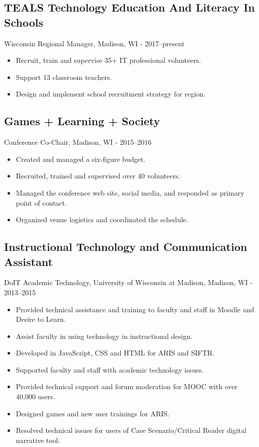 \documentclass[../main.tex]{subfiles}
\begin{document}
\subsection*{TEALS Technology Education And Literacy In Schools}
     Wisconsin Regional Manager, Madison, WI - 2017--present
	\begin{itemize}
		\item{Recruit, train and supervise 35+ IT professional volunteers.}
		\item{Support 13 classroom teachers.}
		\item{Design and implement school recruitment strategy for region.}

	\end{itemize}


\subsection*{Games + Learning + Society }
     Conference Co-Chair, Madison, WI - 2015--2016
	\begin{itemize}
		\item{Created and managed a six-figure budget.}
		\item{Recruited, trained and supervised over 40 volunteers.}
		\item{Managed the conference web site, social media, and responded as primary point of contact.}
		\item{Organized venue logistics and coordinated the schedule.}

	\end{itemize}

	\subsection*{Instructional Technology and Communication Assistant}
     DoIT Academic Technology, University of Wisconsin at Madison, Madison, WI - 2013--2015
	\begin{itemize}
		\item{Provided technical assistance and training to faculty and staff in Moodle and Desire to Learn.}
		\item{Assist faculty in using technology in instructional design.}
		\item{Developed in JavaScript, CSS and HTML for ARIS and SIFTR.}
		\item{Supported faculty and staff with academic technology issues.}
		\item{Provided technical support and forum moderation for MOOC with over 40,000 users.}
		\item{Designed games and new user trainings for ARIS.}
		\item{Resolved technical issues for users of Case Scenario/Critical Reader digital narrative tool.}

	\end{itemize}
\end{document}
